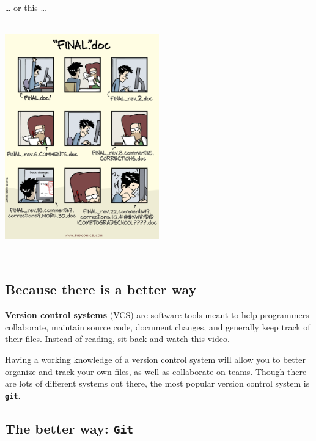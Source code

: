 \documentclass[]{book}
\begin{document}
~

\ldots{} or this \ldots{}

~\\

\includegraphics[width=0.5\textwidth,height=\textheight]{img/version_control_2.png}

~

\hypertarget{because-there-is-a-better-way}{%
\subsection*{Because there is a better way}\label{because-there-is-a-better-way}}

\textbf{Version control systems} (VCS) are software tools meant to help programmers collaborate, maintain source code, document changes, and generally keep track of their files. Instead of reading, sit back and watch \href{https://youtu.be/9GKpbI1siow}{this video}.

Having a working knowledge of a version control system will allow you to better organize and track your own files, as well as collaborate on teams. Though there are lots of different systems out there, the most popular version control system is \textbf{\texttt{git}}.

\hypertarget{the-better-way-git}{%
\subsection*{\texorpdfstring{The better way: \texttt{Git}}{The better way: Git}}\label{the-better-way-git}}
\end{document}
